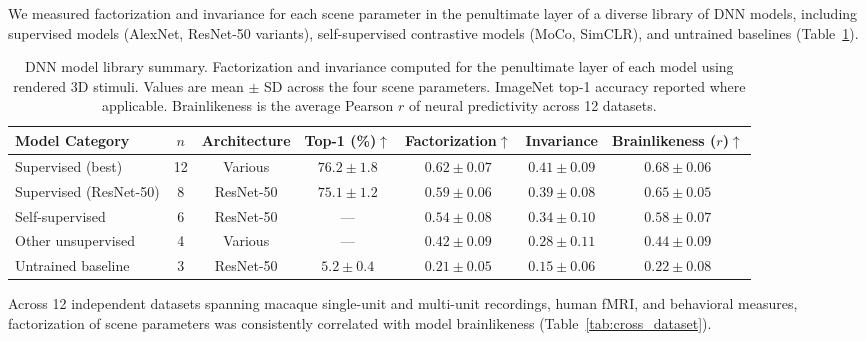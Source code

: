 \documentclass[11pt]{article}
\begin{document}
We measured factorization and invariance for each scene parameter in the penultimate layer of a diverse library of DNN models, including supervised models (AlexNet, ResNet-50 variants), self-supervised contrastive models (MoCo, SimCLR), and untrained baselines (Table~\ref{tab:model_library}).

\begin{table}[H]
\centering
\caption{DNN model library summary. Factorization and invariance computed for the penultimate layer of each model using rendered 3D stimuli. Values are mean $\pm$ SD across the four scene parameters. ImageNet top-1 accuracy reported where applicable. Brainlikeness is the average Pearson $r$ of neural predictivity across 12 datasets.}
\label{tab:model_library}
\begin{tabular}{lcccccc}
\toprule
\textbf{Model Category} & \textbf{$n$} & \textbf{Architecture} & \textbf{Top-1 (\%)}$\uparrow$ & \textbf{Factorization}$\uparrow$ & \textbf{Invariance} & \textbf{Brainlikeness ($r$)}$\uparrow$ \\
\midrule
Supervised (best) & 12 & Various & $76.2 \pm 1.8$ & $\mathbf{0.62 \pm 0.07}$ & $0.41 \pm 0.09$ & $\mathbf{0.68 \pm 0.06}$ \\
Supervised (ResNet-50) & 8 & ResNet-50 & $75.1 \pm 1.2$ & $0.59 \pm 0.06$ & $0.39 \pm 0.08$ & $0.65 \pm 0.05$ \\
Self-supervised & 6 & ResNet-50 & --- & $0.54 \pm 0.08$ & $0.34 \pm 0.10$ & $0.58 \pm 0.07$ \\
Other unsupervised & 4 & Various & --- & $0.42 \pm 0.09$ & $0.28 \pm 0.11$ & $0.44 \pm 0.09$ \\
Untrained baseline & 3 & ResNet-50 & $5.2 \pm 0.4$ & $0.21 \pm 0.05$ & $0.15 \pm 0.06$ & $0.22 \pm 0.08$ \\
\bottomrule
\end{tabular}
\end{table}

Across 12 independent datasets spanning macaque single-unit and multi-unit recordings, human fMRI, and behavioral measures, factorization of scene parameters was consistently correlated with model brainlikeness (Table~\ref{tab:cross_dataset}).
\end{document}
